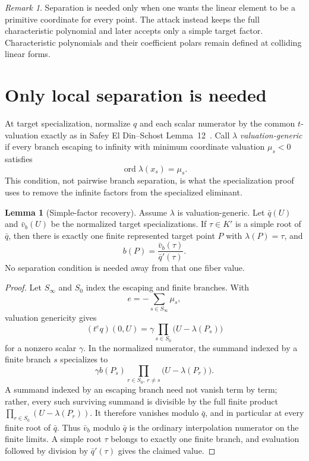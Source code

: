 \documentclass[11pt,a4paper]{article}
\theoremstyle{definition}
\newtheorem{lemma}[theorem]{Lemma}
\theoremstyle{remark}
\newtheorem{remark}[theorem]{Remark}
\newcommand{\ord}{\operatorname{ord}}
\begin{document}
\begin{remark}
Separation is needed only when one wants the linear element to be a primitive coordinate for every point.  The attack instead keeps the full characteristic polynomial and later accepts only a simple target factor.  Characteristic polynomials and their coefficient polars remain defined at colliding linear forms.
\end{remark}

\section{Only local separation is needed}\label{sec:local}

At target specialization, normalize $q$ and each scalar numerator by the common $t$-valuation exactly as in Safey El Din--Schost Lemma~12~\cite{SafeySchost2018}.  Call $\lambda$ \emph{valuation-generic} if every branch escaping to infinity with minimum coordinate valuation $\mu_s<0$ satisfies
\[
 \ord \lambda(x_s)=\mu_s.
\]
This condition, not pairwise branch separation, is what the specialization proof uses to remove the infinite factors from the specialized eliminant.

\begin{lemma}[Simple-factor recovery]\label{lem:simple}
Assume $\lambda$ is valuation-generic.  Let $\bar q(U)$ and $\bar v_b(U)$ be the normalized target specializations.  If $\tau\in K'$ is a simple root of $\bar q$, then there is exactly one finite represented target point $P$ with $\lambda(P)=\tau$, and
\[
 b(P)=\frac{\bar v_b(\tau)}{\bar q'(\tau)}.
\]
No separation condition is needed away from that one fiber value.
\end{lemma}

\begin{proof}
Let $S_\infty$ and $S_0$ index the escaping and finite branches.  With
\[
 e=-\sum_{s\in S_\infty}\mu_s,
\]
valuation genericity gives
\[
 (t^e q)(0,U)=\gamma\prod_{s\in S_0}
   \bigl(U-\lambda(P_s)\bigr)
\]
for a nonzero scalar $\gamma$.  In the normalized numerator, the summand indexed by a finite branch $s$ specializes to
\[
 \gamma b(P_s)\prod_{r\in S_0,\ r\ne s}
   \bigl(U-\lambda(P_r)\bigr).
\]
A summand indexed by an escaping branch need not vanish term by term; rather, every such surviving summand is divisible by the full finite product $\prod_{r\in S_0}(U-\lambda(P_r))$.  It therefore vanishes modulo $\bar q$, and in particular at every finite root of $\bar q$.  Thus $\bar v_b$ modulo $\bar q$ is the ordinary interpolation numerator on the finite limits.  A simple root $\tau$ belongs to exactly one finite branch, and evaluation followed by division by $\bar q'(\tau)$ gives the claimed value.
\end{proof}
\end{document}
